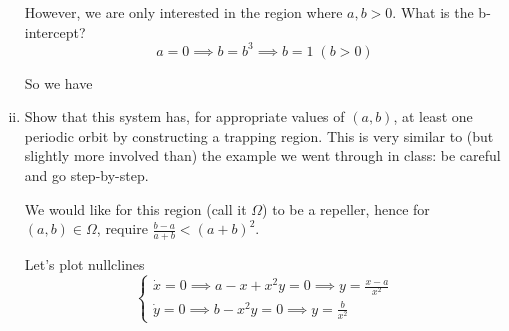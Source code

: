 \documentclass[12pt]{article}
\begin{document}
\begin{enumerate}[(i)]
          However, we are only interested in the region where $a, b > 0$. What is the b-intercept?
          \[a = 0 \implies b = b^3 \implies b = 1 \; (b > 0)\]

          So we have
          \begin{center}
              \color{black}
          \end{center}
          \color{black}

    \item Show that this system has, for appropriate values of $(a,b)$, at least one periodic orbit by constructing a trapping region. This is very similar to (but slightly more involved than) the example we went through in class: be careful and go step-by-step.

          \color{blue}
          We would like for this region (call it $\Omega$) to be a repeller, hence for $(a, b) \in \Omega$, require $\frac{b-a}{a +b } < (a + b)^2$.

          Let's plot nullclines
          \[\begin{cases}
                  \dot x = 0 \implies a - x + x^2y = 0 \implies y = \frac{x - a}{x^2} \\
                  \dot y = 0 \implies b - x^2y = 0 \implies y = \frac{b}{x^2}
              \end{cases}\]


\end{enumerate}
\end{document}

